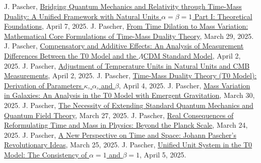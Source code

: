 \documentclass[12pt,a4paper]{article}
\begin{document}
	
	\begin{thebibliography}{99}
		 J. Pascher, \href{https://github.com/jpascher/T0-Time-Mass-Duality/tree/main/2/pdf/English/QMRelTimeMassPart1En.pdf}{Bridging Quantum Mechanics and Relativity through Time-Mass Duality: A Unified Framework with Natural Units \(\alpha = \beta = 1\) Part I: Theoretical Foundations}, April 7, 2025.
		 J. Pascher, \href{https://github.com/jpascher/T0-Time-Mass-Duality/tree/main/2/pdf/English/MathZeitMasseLagrange.pdf}{From Time Dilation to Mass Variation: Mathematical Core Formulations of Time-Mass Duality Theory}, March 29, 2025.
		 J. Pascher, \href{https://github.com/jpascher/T0-Time-Mass-Duality/tree/main/2/pdf/English/MessdifferenzenT0StandardEn.pdf}{Compensatory and Additive Effects: An Analysis of Measurement Differences Between the T0 Model and the \(\Lambda\)CDM Standard Model}, April 2, 2025.
		 J. Pascher, \href{https://github.com/jpascher/T0-Time-Mass-Duality/tree/main/2/pdf/English/NatEinheitenAlpha1En.pdf}{Adjustment of Temperature Units in Natural Units and CMB Measurements}, April 2, 2025.
		 J. Pascher, \href{https://github.com/jpascher/T0-Time-Mass-Duality/tree/main/2/pdf/English/ZeitMasseT0ParamsEn.pdf}{Time-Mass Duality Theory (T0 Model): Derivation of Parameters \(\kappa\), \(\alpha\), and \(\beta\)}, April 4, 2025.
		 J. Pascher, \href{https://github.com/jpascher/T0-Time-Mass-Duality/tree/main/2/pdf/English/MassVarGalaxienEn.pdf}{Mass Variation in Galaxies: An Analysis in the T0 Model with Emergent Gravitation}, March 30, 2025.
		 J. Pascher, \href{https://github.com/jpascher/T0-Time-Mass-Duality/tree/main/2/pdf/English/NotwendigkeitQMErweiterungEn.pdf}{The Necessity of Extending Standard Quantum Mechanics and Quantum Field Theory}, March 27, 2025.
		 J. Pascher, \href{https://github.com/jpascher/T0-Time-Mass-Duality/tree/main/2/pdf/English/JenseitsPlanckEn.pdf}{Real Consequences of Reformulating Time and Mass in Physics: Beyond the Planck Scale}, March 24, 2025.
		 J. Pascher, \href{https://github.com/jpascher/T0-Time-Mass-Duality/tree/main/2/pdf/English/ZeitRaumPascherEn.pdf}{A New Perspective on Time and Space: Johann Pascher’s Revolutionary Ideas}, March 25, 2025.
		 J. Pascher, \href{https://github.com/jpascher/T0-Time-Mass-Duality/tree/main/2/pdf/English/Alpha1Beta1KonsistenzEn.pdf}{Unified Unit System in the T0 Model: The Consistency of \(\alpha = 1\) and \(\beta = 1\)}, April 5, 2025.

\end{thebibliography}
\end{document}

